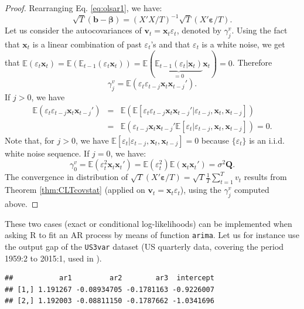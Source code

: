 \documentclass[
  11pt,
]{book}
\theoremstyle{definition}
\theoremstyle{definition}
\theoremstyle{definition}
\theoremstyle{definition}
\theoremstyle{remark}
\begin{document}
\begin{proof}
Rearranging Eq. \eqref{eq:olsar1}, we have:
\[
\sqrt{T}(\mathbf{b}-\boldsymbol{\beta}) =  (X'X/T)^{-1}\sqrt{T}(X'\boldsymbol\varepsilon/T).
\]
Let us consider the autocovariances of \(\mathbf{v}_t = \mathbf{x}_t \varepsilon_t\), denoted by \(\gamma^v_j\). Using the fact that \(\mathbf{x}_t\) is a linear combination of past \(\varepsilon_t\)'s and that \(\varepsilon_t\) is a white noise, we get that \(\mathbb{E}(\varepsilon_t\mathbf{x}_t)=\mathbb{E}(\mathbb{E}_{t-1}(\varepsilon_t\mathbf{x}_t))=\mathbb{E}(\underbrace{\mathbb{E}_{t-1}(\varepsilon_t|\mathbf{x}_t)}_{=0}\mathbf{x}_t)=0\). Therefore
\[
\gamma^v_j = \mathbb{E}(\varepsilon_t\varepsilon_{t-j}\mathbf{x}_t\mathbf{x}_{t-j}').
\]
If \(j>0\), we have
\begin{eqnarray*}
\mathbb{E}(\varepsilon_t\varepsilon_{t-j}\mathbf{x}_t\mathbf{x}_{t-j}')&=&\mathbb{E}(\mathbb{E}[\varepsilon_t\varepsilon_{t-j}\mathbf{x}_t\mathbf{x}_{t-j}'|\varepsilon_{t-j},\mathbf{x}_t,\mathbf{x}_{t-j}])\\
&=&\mathbb{E}(\varepsilon_{t-j}\mathbf{x}_t\mathbf{x}_{t-j}'\mathbb{E}[\varepsilon_t|\varepsilon_{t-j},\mathbf{x}_t,\mathbf{x}_{t-j}])=0.
\end{eqnarray*}
Note that, for \(j>0\), we have \(\mathbb{E}[\varepsilon_t|\varepsilon_{t-j},\mathbf{x}_t,\mathbf{x}_{t-j}]=0\) because \(\{\varepsilon_t\}\) is an i.i.d. white noise sequence. If \(j=0\), we have:
\[
\gamma^v_0 = \mathbb{E}(\varepsilon_t^2\mathbf{x}_t\mathbf{x}_{t}')= \mathbb{E}(\varepsilon_t^2) \mathbb{E}(\mathbf{x}_t\mathbf{x}_{t}')=\sigma^2\mathbf{Q}.
\]
The convergence in distribution of \(\sqrt{T}(X'\boldsymbol\varepsilon/T)=\sqrt{T}\frac{1}{T}\sum_{t=1}^Tv_t\) results from Theorem \ref{thm:CLTcovstat} (applied on \(\mathbf{v}_t=\mathbf{x}_t\varepsilon_t\)), using the \(\gamma_j^v\) computed above.
\end{proof}

These two cases (exact or conditional log-likelihoods) can be implemented when asking R to fit an AR process by means of function \texttt{arima}. Let us for instance use the output gap of the \texttt{US3var} dataset (US quarterly data, covering the period 1959:2 to 2015:1, used in \citet{Gourieroux_Monfort_Renne_2017}).

\begin{verbatim}
##           ar1         ar2        ar3  intercept
## [1,] 1.191267 -0.08934705 -0.1781163 -0.9226007
## [2,] 1.192003 -0.08811150 -0.1787662 -1.0341696
\end{verbatim}
\end{document}
